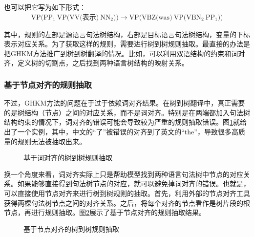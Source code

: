 \parinterval 也可以把它写为如下形式：
\begin{eqnarray}
\textrm{VP(}\textrm{PP}_1\ \textrm{VP(VV(表示)}\ \textrm{NN}_2\textrm{))} \rightarrow \textrm{VP(VBZ(was)}\ \textrm{VP(}\textrm{VBN}_2\ \textrm{PP}_1\textrm{))} \nonumber
\end{eqnarray}

\noindent 其中，规则的左部是源语言句法树结构，右部是目标语言句法树结构，变量的下标表示对应关系。为了获取这样的规则，需要进行树到树规则抽取。最直接的办法是把GHKM方法推广到树到树翻译的情况。比如，可以利用双语结构的约束和词对齐，定义树的切割点，之后找到两种语言树结构的映射关系\cite{liu2009improving}。


\subsubsection{基于节点对齐的规则抽取}

\parinterval 不过，GHKM方法的问题在于过于依赖词对齐结果。在树到树翻译中，真正需要的是树结构（节点）之间的对应关系，而不是词对齐。特别是在两端都加入句法树结构约束的情况下，词对齐的错误可能会导致较为严重的规则抽取错误。图\ref{fig:4-61}就给出了一个实例，其中，中文的``了''被错误的对齐到了英文的``the''，导致很多高质量的规则无法被抽取出来。

\begin{figure}[htp]
\centering

\caption{基于词对齐的树到树规则抽取}
\label{fig:4-61}
\end{figure}

\parinterval 换一个角度来看，词对齐实际上只是帮助模型找到两种语言句法树中节点的对应关系。如果能够直接得到句法树节点的对应，就可以避免掉词对齐的错误。也就是，可以直接使用节点对齐来进行树到树规则的抽取。首先，利用外部的节点对齐工具获得两棵句法树节点之间的对齐关系。之后，将每个对齐的节点看作是树片段的根节点，再进行规则抽取。图\ref{fig:4-62}展示了基于节点对齐的规则抽取结果。

\begin{figure}[htb]
\centering

\caption{基于节点对齐的树到树规则抽取}
\label{fig:4-62}
\end{figure}

